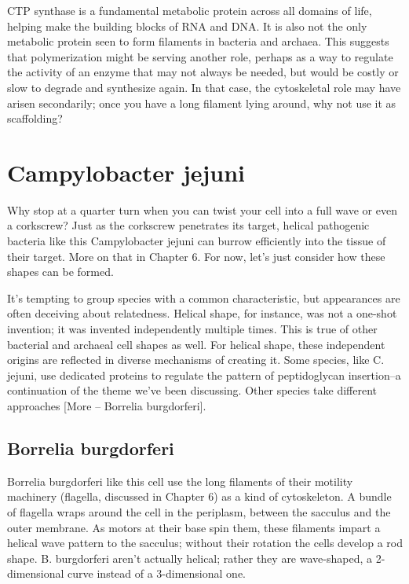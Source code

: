 \documentclass[]{tufte-book}
\begin{document}
CTP synthase is a fundamental metabolic protein across all domains of
life, helping make the building blocks of RNA and DNA. It is also not
the only metabolic protein seen to form filaments in bacteria and
archaea. This suggests that polymerization might be serving another
role, perhaps as a way to regulate the activity of an enzyme that may
not always be needed, but would be costly or slow to degrade and
synthesize again. In that case, the cytoskeletal role may have arisen
secondarily; once you have a long filament lying around, why not use it
as scaffolding?

\section{Campylobacter jejuni}\label{campylobacter-jejuni}

Why stop at a quarter turn when you can twist your cell into a full wave
or even a corkscrew? Just as the corkscrew penetrates its target,
helical pathogenic bacteria like this Campylobacter jejuni can burrow
efficiently into the tissue of their target. More on that in Chapter 6.
For now, let's just consider how these shapes can be formed.

It's tempting to group species with a common characteristic, but
appearances are often deceiving about relatedness. Helical shape, for
instance, was not a one-shot invention; it was invented independently
multiple times. This is true of other bacterial and archaeal cell shapes
as well. For helical shape, these independent origins are reflected in
diverse mechanisms of creating it. Some species, like C. jejuni, use
dedicated proteins to regulate the pattern of peptidoglycan insertion--a
continuation of the theme we've been discussing. Other species take
different approaches {[}More -- Borrelia burgdorferi{]}.

\subsection{Borrelia burgdorferi}\label{Borrelia_burgdorferi}

Borrelia burgdorferi like this cell use the long filaments of their
motility machinery (flagella, discussed in Chapter 6) as a kind of
cytoskeleton. A bundle of flagella wraps around the cell in the
periplasm, between the sacculus and the outer membrane. As motors at
their base spin them, these filaments impart a helical wave pattern to
the sacculus; without their rotation the cells develop a rod shape. B.
burgdorferi aren't actually helical; rather they are wave-shaped, a
2-dimensional curve instead of a 3-dimensional one.
\end{document}
